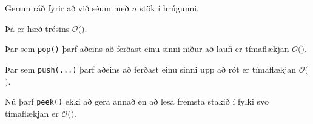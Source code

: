 {
}

{
	{
		\item<1-> Gerum ráð fyrir að við séum með $n$ stök í hrúgunni.
		\item<2-> Þá er hæð trésins $\mathcal{O}($\onslide<3->{$\log n$}$)$.
		\item<4-> Þar sem \texttt{pop()} þarf aðeins að ferðast einu sinni niður að laufi er tímaflækjan $\mathcal{O}($\onslide<5->{$\log n$}$)$.
		\item<6-> Þar sem \texttt{push(...)} þarf aðeins að ferðast einu sinni upp að rót er tímaflækjan $\mathcal{O}($\onslide<7->{$\log n$}$)$.
		\item<8-> Nú þarf \texttt{peek()} ekki að gera annað en að lesa fremsta stakið í fylki svo tímaflækjan er $\mathcal{O}($\onslide<9->{$\,1\,$}$)$.
	}
}

{
}


